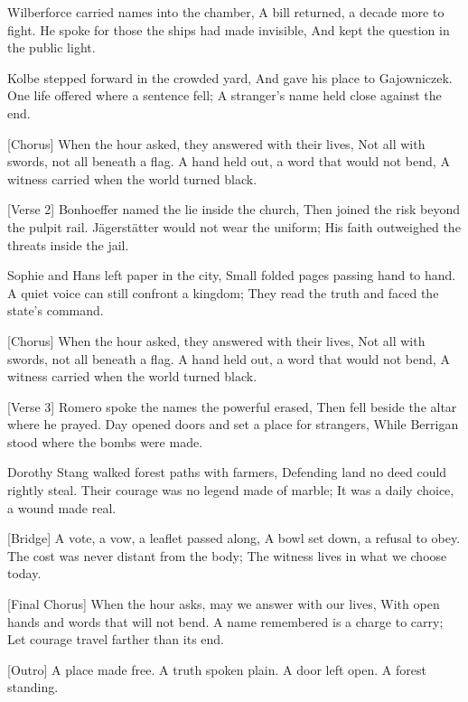 \begin{lyrics}
[Verse 1]
Wilberforce carried names into the chamber,
A bill returned, a decade more to fight.
He spoke for those the ships had made invisible,
And kept the question in the public light.

Kolbe stepped forward in the crowded yard,
And gave his place to Gajowniczek.
One life offered where a sentence fell;
A stranger’s name held close against the end.

[Chorus]
When the hour asked, they answered with their lives,
Not all with swords, not all beneath a flag.
A hand held out, a word that would not bend,
A witness carried when the world turned black.

[Verse 2]
Bonhoeffer named the lie inside the church,
Then joined the risk beyond the pulpit rail.
Jägerstätter would not wear the uniform;
His faith outweighed the threats inside the jail.

Sophie and Hans left paper in the city,
Small folded pages passing hand to hand.
A quiet voice can still confront a kingdom;
They read the truth and faced the state’s command.

[Chorus]
When the hour asked, they answered with their lives,
Not all with swords, not all beneath a flag.
A hand held out, a word that would not bend,
A witness carried when the world turned black.

[Verse 3]
Romero spoke the names the powerful erased,
Then fell beside the altar where he prayed.
Day opened doors and set a place for strangers,
While Berrigan stood where the bombs were made.

Dorothy Stang walked forest paths with farmers,
Defending land no deed could rightly steal.
Their courage was no legend made of marble;
It was a daily choice, a wound made real.

[Bridge]
A vote, a vow, a leaflet passed along,
A bowl set down, a refusal to obey.
The cost was never distant from the body;
The witness lives in what we choose today.

[Final Chorus]
When the hour asks, may we answer with our lives,
With open hands and words that will not bend.
A name remembered is a charge to carry;
Let courage travel farther than its end.

[Outro]
A place made free.
A truth spoken plain.
A door left open.
A forest standing.
\end{lyrics}

